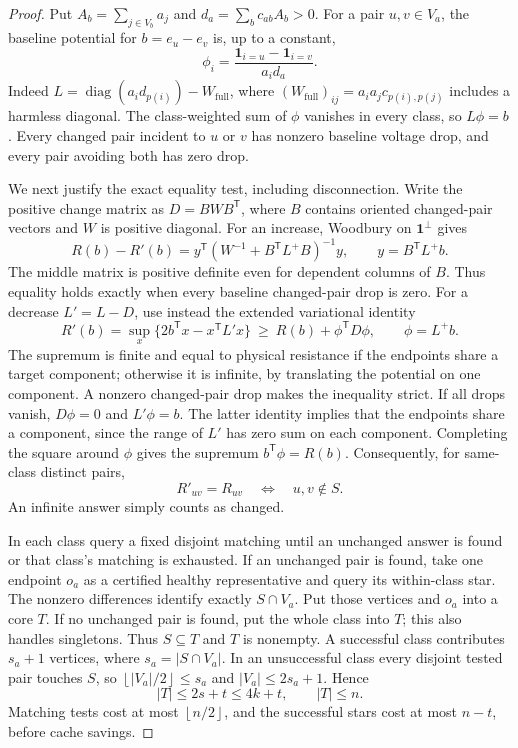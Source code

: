 \documentclass[11pt,letterpaper]{article}
\newcommand{\one}{\mathbf 1}
\newcommand{\diag}{\operatorname{diag}}
\newcommand{\floor}[1]{\left\lfloor #1\right\rfloor}
\begin{document}
\begin{proof}
Put $A_b=\sum_{j\in V_b}a_j$ and $d_a=\sum_b c_{ab}A_b>0$. For a pair $u,v\in V_a$, the baseline potential for $b=e_u-e_v$ is, up to a constant,
\[
 \phi_i=\frac{\mathbf1_{i=u}-\mathbf1_{i=v}}{a_i d_a}.
\]
Indeed $L=\diag(a_i d_{p(i)})-W_{\mathrm{full}}$, where $(W_{\mathrm{full}})_{ij}=a_i a_j c_{p(i),p(j)}$ includes a harmless diagonal. The class-weighted sum of $\phi$ vanishes in every class, so $L\phi=b$. Every changed pair incident to $u$ or $v$ has nonzero baseline voltage drop, and every pair avoiding both has zero drop.

We next justify the exact equality test, including disconnection. Write the positive change matrix as $D=BWB^{\mathsf T}$, where $B$ contains oriented changed-pair vectors and $W$ is positive diagonal. For an increase, Woodbury on $\one^\perp$ gives
\[
 R(b)-R'(b)=y^{\mathsf T}(W^{-1}+B^{\mathsf T}L^+B)^{-1}y,
 \qquad y=B^{\mathsf T}L^+b.
\]
The middle matrix is positive definite even for dependent columns of $B$. Thus equality holds exactly when every baseline changed-pair drop is zero. For a decrease $L'=L-D$, use instead the extended variational identity
\[
 R'(b)=\sup_x\{2b^{\mathsf T}x-x^{\mathsf T}L'x\}
 \ \ge\ R(b)+\phi^{\mathsf T}D\phi,\qquad \phi=L^+b.
\]
The supremum is finite and equal to physical resistance if the endpoints share a target component; otherwise it is infinite, by translating the potential on one component. A nonzero changed-pair drop makes the inequality strict. If all drops vanish, $D\phi=0$ and $L'\phi=b$. The latter identity implies that the endpoints share a component, since the range of $L'$ has zero sum on each component. Completing the square around $\phi$ gives the supremum $b^{\mathsf T}\phi=R(b)$. Consequently, for same-class distinct pairs,
\[
 R'_{uv}=R_{uv}\quad\Longleftrightarrow\quad u,v\notin S.
\]
An infinite answer simply counts as changed.

In each class query a fixed disjoint matching until an unchanged answer is found or that class's matching is exhausted. If an unchanged pair is found, take one endpoint $o_a$ as a certified healthy representative and query its within-class star. The nonzero differences identify exactly $S\cap V_a$. Put those vertices and $o_a$ into a core $T$. If no unchanged pair is found, put the whole class into $T$; this also handles singletons. Thus $S\subseteq T$ and $T$ is nonempty. A successful class contributes $s_a+1$ vertices, where $s_a=|S\cap V_a|$. In an unsuccessful class every disjoint tested pair touches $S$, so $\floor{|V_a|/2}\le s_a$ and $|V_a|\le2s_a+1$. Hence
\[
 |T|\le2s+t\le4k+t,\qquad |T|\le n.
\]
Matching tests cost at most $\floor{n/2}$, and the successful stars cost at most $n-t$, before cache savings.


\end{proof}
\end{document}
